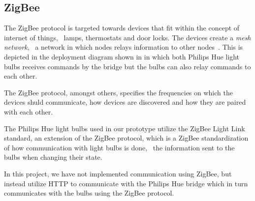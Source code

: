 \subsection{ZigBee}

The ZigBee protocol is targeted towards devices that fit within the concept of internet of things, \eg~lamps, thermostats and door locks. The devices create a \emph{mesh network}, \ie~a network in which nodes relays information to other nodes~\cite{zigbee:zigbee-pro}. This is depicted in the deployment diagram shown in  in which both Philips Hue light bulbs receives commands by the bridge but the bulbs can also relay commands to each other.

The ZigBee protocol, amongst others, specifies the frequencies on which the devices shuld communicate, how devices are discovered and how they are paired with each other.

The Philips Hue light bulbs used in our prototype utilize the ZigBee Light Link standard, an extension of the ZigBee protocol, which is a ZigBee standardization of how communication with light bulbs is done, \eg~the information sent to the bulbs when changing their state.

In this project, we have not implemented communication using ZigBee, but instead utilize HTTP to communicate with the Philips Hue bridge which in turn communicates with the bulbs using the ZigBee protocol.

